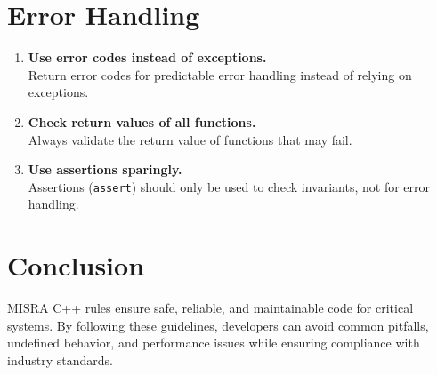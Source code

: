 \section{Error Handling}
\begin{enumerate}
    \item \textbf{Use error codes instead of exceptions.} \\
    Return error codes for predictable error handling instead of relying on exceptions.

    \item \textbf{Check return values of all functions.} \\
    Always validate the return value of functions that may fail.

    \item \textbf{Use assertions sparingly.} \\
    Assertions (\texttt{assert}) should only be used to check invariants, not for error handling.
\end{enumerate}

\section*{Conclusion}
MISRA C++ rules ensure safe, reliable, and maintainable code for critical systems. By following these guidelines, developers can avoid common pitfalls, undefined behavior, and performance issues while ensuring compliance with industry standards.
